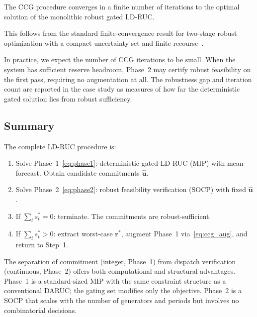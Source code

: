 \documentclass[journal]{IEEEtran}
\begin{document}
\begin{proposition}\label{prop:ccg}
The CCG procedure converges in a finite number of iterations to the
optimal solution of the monolithic robust gated LD-RUC.
\end{proposition}

This follows from the standard finite-convergence result for
two-stage robust optimization with a compact uncertainty set
and finite recourse~\cite{zeng2013solving}.

In practice, we expect the number of CCG iterations to be small.
When the system has sufficient reserve headroom, Phase~2 may certify
robust feasibility on the first pass, requiring no augmentation at
all.
The robustness gap and iteration count are reported in the case study
as measures of how far the deterministic gated solution lies from
robust sufficiency.

\subsection{Summary}\label{sec:formulation_summary}

The complete LD-RUC procedure is:
\begin{enumerate}
  \item Solve Phase~1~\eqref{eq:phase1}: deterministic gated LD-RUC
    (MIP) with mean forecast.
    Obtain candidate commitments $\hat{\mathbf{u}}$.
  \item Solve Phase~2~\eqref{eq:phase2}: robust feasibility
    verification (SOCP) with fixed $\hat{\mathbf{u}}$.
  \item If $\sum_t s_t^* = 0$: terminate.
    The commitments are robust-sufficient.
  \item If $\sum_t s_t^* > 0$: extract worst-case
    $\mathbf{r}^*$, augment Phase~1
    via~\eqref{eq:ccg_aug}, and return to Step~1.
\end{enumerate}

The separation of commitment (integer, Phase~1) from dispatch
verification (continuous, Phase~2) offers both computational and
structural advantages.
Phase~1 is a standard-sized MIP with the same constraint structure as
a conventional DARUC; the gating set modifies only the objective.
Phase~2 is a SOCP that scales with the number of generators and
periods but involves no combinatorial decisions.


\end{document}
